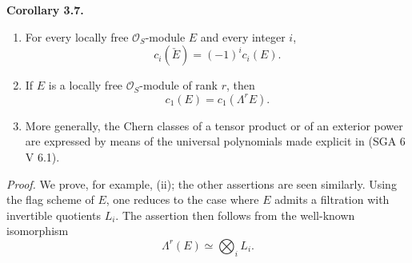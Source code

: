 \documentclass[11pt]{article}
\newenvironment{statement}[1]{\par\medskip\noindent\textbf{#1.}\ }{\par\medskip}
\begin{document}
\label{sga5:VII:corollary:3.7}\begin{statement}{Corollary 3.7}
\begin{enumerate}[label=(\roman*)]
\item For every locally free $\mathcal O_S$-module $E$ and every integer $i$,
\[
c_i(\check E)=(-1)^i c_i(E).
\]
\item If $E$ is a locally free $\mathcal O_S$-module of rank $r$, then
\[
c_1(E)=c_1(\Lambda^rE).
\]
\item More generally, the Chern classes of a tensor product or of an exterior power are expressed by means of the universal polynomials made explicit in (SGA 6 V 6.1).
\end{enumerate}
\end{statement}

\emph{Proof.} We prove, for example, (ii); the other assertions are seen similarly. Using the flag scheme of $E$, one reduces to the case where $E$ admits a filtration with invertible quotients $L_i$. The assertion then follows from the well-known isomorphism
\[
\Lambda^r(E)\simeq\bigotimes_i L_i.
\]
\end{document}
